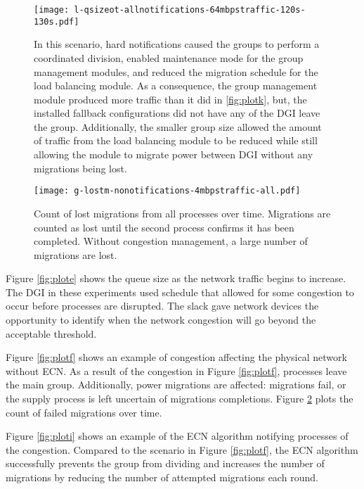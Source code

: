\begin{figure}
\centering
\texttt{[image: l-qsizeot-allnotifications-64mbpstraffic-120s-130s.pdf]}
\caption[Effect on queue size as a large amount of network traffic is introduced.]
{
In this scenario, hard notifications caused the groups to perform a coordinated division, enabled maintenance mode for the group management modules, and reduced the migration schedule for the load balancing module.
As a consequence, the group management module produced more traffic than it did in \ref{fig:plotk}, but, the installed fallback configurations did not have any of the \ac{DGI} leave the group.
Additionally, the smaller group size allowed the amount of traffic from the load balancing module to be reduced while still allowing the module to migrate power between \ac{DGI} without any migrations being lost.
}
\label{fig:plotl}
\end{figure}

\begin{figure}
\centering
\texttt{[image: g-lostm-nonotifications-4mbpstraffic-all.pdf]}
\caption{Count of lost migrations from all processes over time. Migrations are counted as lost until the second process confirms it has been completed. Without congestion management, a large number of migrations are lost.}
\label{fig:plotg}
\end{figure}

Figure \ref{fig:plote} shows the queue size as the network traffic begins to increase.
The \ac{DGI} in these experiments used schedule that allowed for some congestion to occur before processes are disrupted.
The slack gave network devices the opportunity to identify when the network congestion will go beyond the acceptable threshold.

Figure \ref{fig:plotf} shows an example of congestion affecting the physical network without \ac{ECN}.
As a result of the congestion in Figure \ref{fig:plotf}, processes leave the main group.
Additionally, power migrations are affected: migrations fail, or the supply process is left uncertain of migrations completions.
Figure \ref{fig:plotg} plots the count of failed migrations over time.

Figure \ref{fig:ploti} shows an example of the \ac{ECN} algorithm notifying processes of the congestion.
Compared to the scenario in Figure \ref{fig:plotf}, the \ac{ECN} algorithm successfully prevents the group from dividing and increases the number of migrations by reducing the number of attempted migrations each round.


